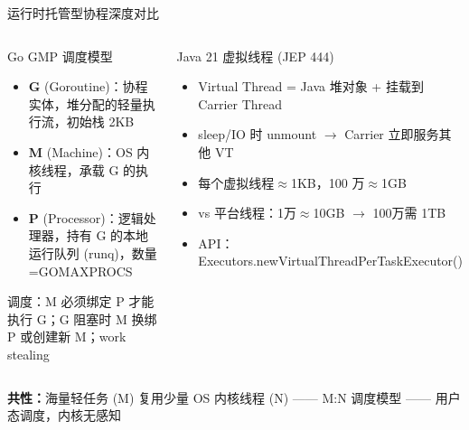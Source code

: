 \begin{frame}{运行时托管型协程深度对比}
  \begin{columns}[T]
    \begin{block}{Go GMP 调度模型}
      \vspace{0.2em}
      \begin{itemize}
        \item \textbf{G} (Goroutine)：协程实体，堆分配的轻量执行流，初始栈 2KB
        \item \textbf{M} (Machine)：OS 内核线程，承载 G 的执行
        \item \textbf{P} (Processor)：逻辑处理器，持有 G 的本地运行队列 (runq)，数量=GOMAXPROCS
      \end{itemize}
      \vspace{0.2em}
      {\footnotesize 调度：M 必须绑定 P 才能执行 G；G 阻塞时 M 换绑 P 或创建新 M；work stealing}
    \end{block}

    \begin{exampleblock}{Java 21 虚拟线程 (JEP 444)}
      \vspace{0.2em}
      \begin{itemize}
        \item Virtual Thread = Java 堆对象 + 挂载到 Carrier Thread
        \item sleep/IO 时 unmount $\rightarrow$ Carrier 立即服务其他 VT
        \item 每个虚拟线程$\approx$1KB，100 万$\approx$1GB
        \item {\color{corRed}vs 平台线程：1万$\approx$10GB $\rightarrow$ 100万需 1TB}
        \item {\footnotesize API：Executors.newVirtualThreadPerTaskExecutor()}
      \end{itemize}
    \end{exampleblock}
  \end{columns}

  \vspace{0.5em}
  \begin{center}
    \textcolor{midblue}{\textbf{共性：}}海量轻任务 (M) 复用少量 OS 内核线程 (N) —— M:N 调度模型 —— 用户态调度，内核无感知
  \end{center}
\end{frame}

